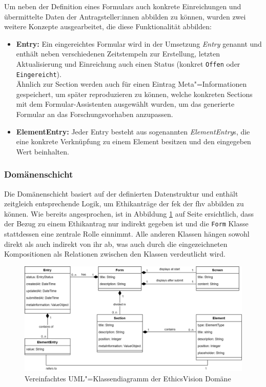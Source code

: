 \documentclass[a4paper,12pt,twoside]{scrreprt}
\begin{document}
Um neben der Definition eines Formulars auch konkrete Einreichungen und übermittelte Daten der Antragsteller:innen abbilden zu können, wurden zwei weitere Konzepte ausgearbeitet, die diese Funktionalität abbilden:
\begin{itemize}
    \item \textbf{Entry:} Ein eingereichtes Formular wird in der Umsetzung \textit{Entry} genannt und enthält neben verschiedenen Zeitstempeln zur Erstellung, letzten Aktualisierung und Einreichung auch einen Status (konkret \texttt{Offen} oder \texttt{Eingereicht}).\\
    Ähnlich zur Section werden auch für einen Eintrag Meta"=Informationen gespeichert, um später reproduzieren zu können, welche konkreten Sections mit dem Formular-Assistenten ausgewählt wurden, um das generierte Formular an das Forschungsvorhaben anzupassen.
    \item \textbf{ElementEntry:} Jeder Entry besteht aus sogenannten \textit{ElementEntry}s, die eine konkrete Verknüpfung zu einem Element besitzen und den eingegeben Wert beinhalten.
\end{itemize}

\subsubsection*{Domänenschicht}
\label{sub-sub-sec:backend-domänenschicht}

Die Domänenschicht basiert auf der definierten Datenstruktur und enthält zeitgleich entsprechende Logik, um Ethikanträge der \acl{fek} der \acl{fhv} abbilden zu können. Wie bereits angesprochen, ist in Abbildung \ref{fig:ethics-vision-uml} auf Seite \pageref{fig:ethics-vision-uml} ersichtlich, dass der Bezug zu einem Ethikantrag nur indirekt gegeben ist und die \texttt{Form} Klasse stattdessen eine zentrale Rolle einnimmt. Alle anderen Klassen hängen sowohl direkt als auch indirekt von ihr ab, was auch durch die eingezeichneten Kompositionen als Relationen zwischen den Klassen verdeutlicht wird.

\begin{figure}[ht]
    \includegraphics[width=\linewidth]{thesis/images/Luidold_EthicsVision-Klassendiagramm.png}
    \caption{Vereinfachtes UML"=Klassendiagramm der EthicsVision Domäne}
    \label{fig:ethics-vision-uml}
\end{figure}
\end{document}
